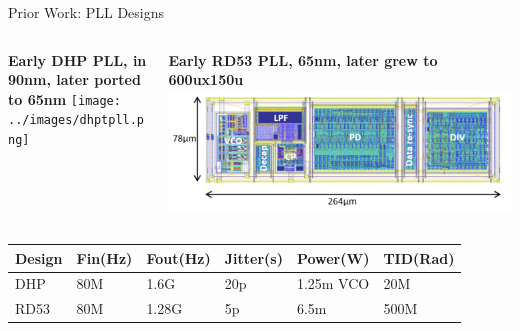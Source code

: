 \begin{frame}{Prior Work: PLL Designs}
\protect\hypertarget{prior-work-pll-designs}{}
\begin{columns}[T]
\begin{column}{0.48\textwidth}
\textbf{Early DHP PLL, in 90nm, later ported to 65nm}
\texttt{[image: ../images/dhptpll.png]}
\end{column}

\begin{column}{0.48\textwidth}
\textbf{Early RD53 PLL, 65nm, later grew to 600ux150u}
\includegraphics{../images/rd53pll.jpeg}
\end{column}
\end{columns}

\begin{longtable}[]{@{}llllll@{}}
\toprule()
Design & Fin(Hz) & Fout(Hz) & Jitter(s) & Power(W) & TID(Rad) \\
\midrule()
\endhead
DHP & 80M & 1.6G & 20p & 1.25m VCO & 20M \\
RD53 & 80M & 1.28G & 5p & 6.5m & 500M \\
\bottomrule()
\end{longtable}
\end{frame}

